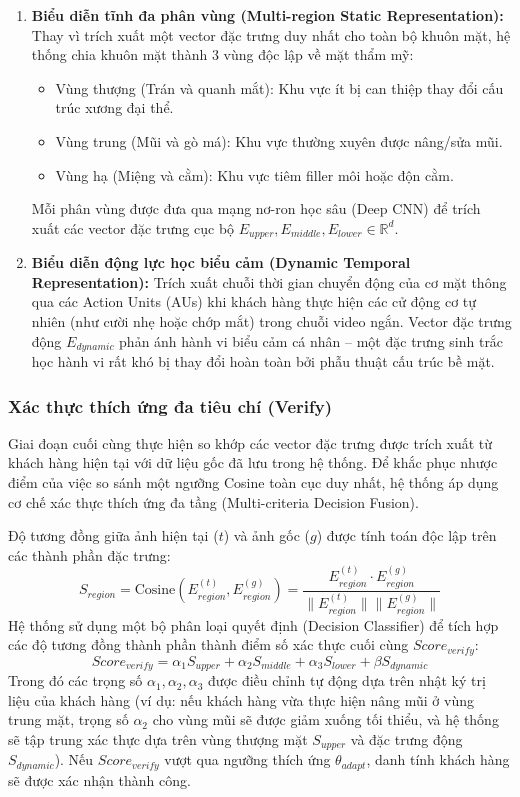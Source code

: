 \begin{enumerate}
    \item \textbf{Biểu diễn tĩnh đa phân vùng (Multi-region Static Representation):} Thay vì trích xuất một vector đặc trưng duy nhất cho toàn bộ khuôn mặt, hệ thống chia khuôn mặt thành 3 vùng độc lập về mặt thẩm mỹ:
    \begin{itemize}
        \item Vùng thượng (Trán và quanh mắt): Khu vực ít bị can thiệp thay đổi cấu trúc xương đại thể.
        \item Vùng trung (Mũi và gò má): Khu vực thường xuyên được nâng/sửa mũi.
        \item Vùng hạ (Miệng và cằm): Khu vực tiêm filler môi hoặc độn cằm.
    \end{itemize}
    Mỗi phân vùng được đưa qua mạng nơ-ron học sâu (Deep CNN) để trích xuất các vector đặc trưng cục bộ $E_{upper}, E_{middle}, E_{lower} \in \mathbb{R}^{d}$.
    
    \item \textbf{Biểu diễn động lực học biểu cảm (Dynamic Temporal Representation):} Trích xuất chuỗi thời gian chuyển động của cơ mặt thông qua các Action Units (AUs) khi khách hàng thực hiện các cử động cơ tự nhiên (như cười nhẹ hoặc chớp mắt) trong chuỗi video ngắn. Vector đặc trưng động $E_{dynamic}$ phản ánh hành vi biểu cảm cá nhân – một đặc trưng sinh trắc học hành vi rất khó bị thay đổi hoàn toàn bởi phẫu thuật cấu trúc bề mặt.
\end{enumerate}

\subsubsection{Xác thực thích ứng đa tiêu chí (Verify)}
Giai đoạn cuối cùng thực hiện so khớp các vector đặc trưng được trích xuất từ khách hàng hiện tại với dữ liệu gốc đã lưu trong hệ thống. Để khắc phục nhược điểm của việc so sánh một ngưỡng Cosine toàn cục duy nhất, hệ thống áp dụng cơ chế xác thực thích ứng đa tầng (Multi-criteria Decision Fusion).

Độ tương đồng giữa ảnh hiện tại ($t$) và ảnh gốc ($g$) được tính toán độc lập trên các thành phần đặc trưng:
\begin{equation}
    S_{region} = \text{Cosine}(E_{region}^{(t)}, E_{region}^{(g)}) = \frac{E_{region}^{(t)} \cdot E_{region}^{(g)}}{\|E_{region}^{(t)}\| \|E_{region}^{(g)}\|}
\end{equation}
Hệ thống sử dụng một bộ phân loại quyết định (Decision Classifier) để tích hợp các độ tương đồng thành phần thành điểm số xác thực cuối cùng $Score_{verify}$:
\begin{equation}
    Score_{verify} = \alpha_1 S_{upper} + \alpha_2 S_{middle} + \alpha_3 S_{lower} + \beta S_{dynamic}
\end{equation}
Trong đó các trọng số $\alpha_1, \alpha_2, \alpha_3$ được điều chỉnh tự động dựa trên nhật ký trị liệu của khách hàng (ví dụ: nếu khách hàng vừa thực hiện nâng mũi ở vùng trung mặt, trọng số $\alpha_2$ cho vùng mũi sẽ được giảm xuống tối thiểu, và hệ thống sẽ tập trung xác thực dựa trên vùng thượng mặt $S_{upper}$ và đặc trưng động $S_{dynamic}$). Nếu $Score_{verify}$ vượt qua ngưỡng thích ứng $\theta_{adapt}$, danh tính khách hàng sẽ được xác nhận thành công.